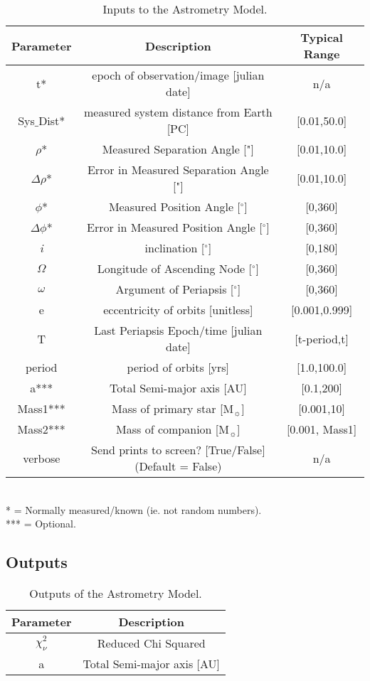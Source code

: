 \documentclass[10pt,preprint]{aastex}
\begin{document}
\begin{table}[h]
\centering
\caption{ Inputs to the Astrometry Model.}
\begin{tabular}{c c c}
\hline\hline
Parameter & Description & Typical Range \\
\hline
t* & epoch of observation/image [julian date] & n/a\\
Sys$\_$Dist* & measured system distance from Earth [PC] &  [0.01,50.0]\\
$\rho$* & Measured Separation Angle ["] & [0.01,10.0]\\
$\Delta\rho$* & Error in Measured Separation Angle ["] & [0.01,10.0]\\
$\phi$*  & Measured Position Angle  [$^{\circ}$] & [0,360]\\
$\Delta\phi$*  & Error in Measured Position Angle  [$^{\circ}$] & [0,360]\\
{\it i} & inclination [$^{\circ}$] & [0,180]\\
$\Omega$ & Longitude of Ascending Node [$^{\circ}$] & [0,360]\\
$\omega$ & Argument of Periapsis [$^{\circ}$] & [0,360]\\
e & eccentricity of orbits [unitless] & [0.001,0.999]\\
T & Last Periapsis Epoch/time [julian date] & [t-period,t]\\
period & period of orbits [yrs] & [1.0,100.0]\\
a*** & Total Semi-major axis [AU]  & [0.1,200] \\
Mass1*** & Mass of primary star [M$_{\sun}$] & [0.001,10] \\
Mass2*** & Mass of companion [M$_{\sun}$] & [0.001, Mass1] \\
verbose & Send prints to screen? [True/False](Default = False) & n/a\\
\hline
\end{tabular}
\\
 * = Normally measured/known (ie. not random numbers).\\
 *** = Optional.
\end{table}

\subsection{Outputs}

\begin{table}[h]
\centering
\caption{ Outputs of the Astrometry Model.}
\begin{tabular}{c c}
\hline\hline
Parameter & Description \\
\hline
$\chi^{2}_{\nu}$ & Reduced Chi Squared \\
a & Total Semi-major axis [AU]  \\

\hline
\end{tabular}
\end{table}
\end{document}
